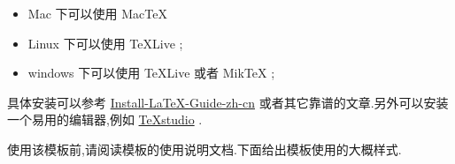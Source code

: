\documentclass{cumcmthesis}
\begin{document}
\begin{itemize}
    \item Mac 下可以使用 Mac\TeX{}
    \item Linux 下可以使用 \TeX{}Live ;
    \item windows 下可以使用 \TeX{}Live 或者 Mik\TeX{} ;
\end{itemize}

具体安装可以参考 \href{https://github.com/OsbertWang/install-latex-guide-zh-cn/releases/}{Install-LaTeX-Guide-zh-cn} 或者其它靠谱的文章.另外可以安装一个易用的编辑器,例如 \href{https://mirrors.tuna.tsinghua.edu.cn/github-release/texstudio-org/texstudio/LatestRelease/}{\TeX{}studio} .

使用该模板前,请阅读模板的使用说明文档.下面给出模板使用的大概样式.

\end{document}
